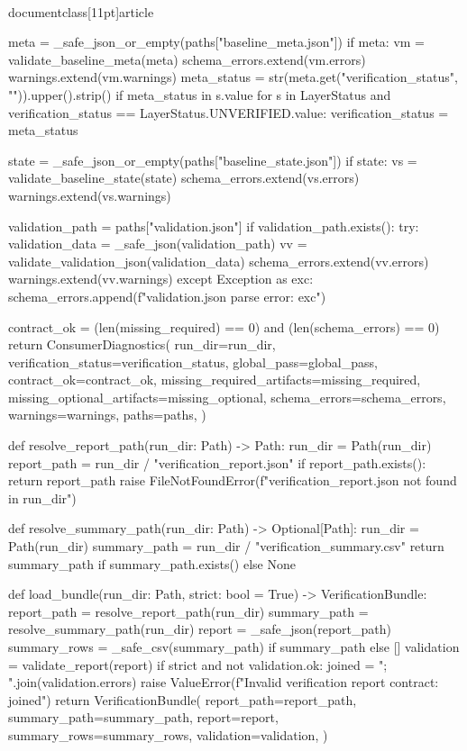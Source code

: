 \\documentclass[11pt]{article}
\begin{document}
\begin{CodeBlock}
    meta = _safe_json_or_empty(paths["baseline_meta.json"])
    if meta:
        vm = validate_baseline_meta(meta)
        schema_errors.extend(vm.errors)
        warnings.extend(vm.warnings)
        meta_status = str(meta.get("verification_status", "")).upper().strip()
        if meta_status in {s.value for s in LayerStatus} and verification_status == LayerStatus.UNVERIFIED.value:
            verification_status = meta_status

    state = _safe_json_or_empty(paths["baseline_state.json"])
    if state:
        vs = validate_baseline_state(state)
        schema_errors.extend(vs.errors)
        warnings.extend(vs.warnings)

    validation_path = paths["validation.json"]
    if validation_path.exists():
        try:
            validation_data = _safe_json(validation_path)
            vv = validate_validation_json(validation_data)
            schema_errors.extend(vv.errors)
            warnings.extend(vv.warnings)
        except Exception as exc:
            schema_errors.append(f"validation.json parse error: {exc}")

    contract_ok = (len(missing_required) == 0) and (len(schema_errors) == 0)
    return ConsumerDiagnostics(
        run_dir=run_dir,
        verification_status=verification_status,
        global_pass=global_pass,
        contract_ok=contract_ok,
        missing_required_artifacts=missing_required,
        missing_optional_artifacts=missing_optional,
        schema_errors=schema_errors,
        warnings=warnings,
        paths=paths,
    )


def resolve_report_path(run_dir: Path) -> Path:
    run_dir = Path(run_dir)
    report_path = run_dir / "verification_report.json"
    if report_path.exists():
        return report_path
    raise FileNotFoundError(f"verification_report.json not found in {run_dir}")


def resolve_summary_path(run_dir: Path) -> Optional[Path]:
    run_dir = Path(run_dir)
    summary_path = run_dir / "verification_summary.csv"
    return summary_path if summary_path.exists() else None


def load_bundle(run_dir: Path, strict: bool = True) -> VerificationBundle:
    report_path = resolve_report_path(run_dir)
    summary_path = resolve_summary_path(run_dir)
    report = _safe_json(report_path)
    summary_rows = _safe_csv(summary_path) if summary_path else []
    validation = validate_report(report)
    if strict and not validation.ok:
        joined = "; ".join(validation.errors)
        raise ValueError(f"Invalid verification report contract: {joined}")
    return VerificationBundle(
        report_path=report_path,
        summary_path=summary_path,
        report=report,
        summary_rows=summary_rows,
        validation=validation,
    )



\end{CodeBlock}
\end{document}
